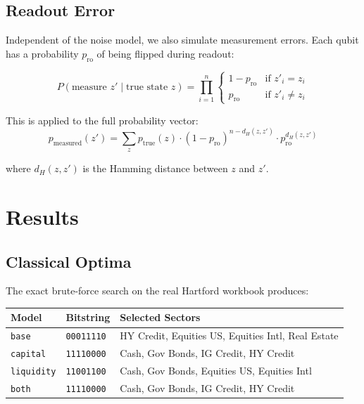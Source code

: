 \documentclass[12pt, a4paper]{article}
\begin{document}
\subsection{Readout Error}

Independent of the noise model, we also simulate measurement errors. Each qubit
has a probability $p_{\text{ro}}$ of being flipped during readout:

\[
P(\text{measure } z' \mid \text{true state } z) = \prod_{i=1}^n
\begin{cases}
1 - p_{\text{ro}} & \text{if } z'_i = z_i \\
p_{\text{ro}} & \text{if } z'_i \neq z_i
\end{cases}
\]

This is applied to the full probability vector:
\[
p_{\text{measured}}(z') = \sum_{z} p_{\text{true}}(z) \cdot (1 - p_{\text{ro}})^{n - d_H(z, z')} \cdot p_{\text{ro}}^{d_H(z, z')}
\]

where $d_H(z, z')$ is the Hamming distance between $z$ and $z'$.


\section{Results}

\subsection{Classical Optima}

The exact brute-force search on the real Hartford workbook produces:

\begin{center}
\begin{tabular}{llp{6cm}}
\toprule
\textbf{Model} & \textbf{Bitstring} & \textbf{Selected Sectors} \\
\midrule
\texttt{base} & \texttt{00011110} & HY Credit, Equities US, Equities Intl, Real Estate \\
\texttt{capital} & \texttt{11110000} & Cash, Gov Bonds, IG Credit, HY Credit \\
\texttt{liquidity} & \texttt{11001100} & Cash, Gov Bonds, Equities US, Equities Intl \\
\texttt{both} & \texttt{11110000} & Cash, Gov Bonds, IG Credit, HY Credit \\
\bottomrule
\end{tabular}
\end{center}
\end{document}
